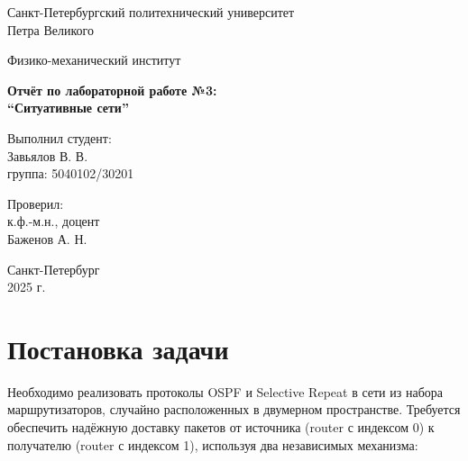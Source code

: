 \documentclass[a4paper,12pt]{article}
\begin{document}
\begin{titlepage}
    \begin{center}
        {\large Санкт-Петербургский политехнический университет\\Петра Великого}
    \end{center}
    
    \begin{center}
        {\large Физико-механический институт}
    \end{center}
    
    \vspace{8em}
    
    \begin{center}
        {\bfseries Отчёт по лабораторной работе №3:\\ ``Ситуативные сети''}
    \end{center}
    
    \vspace{4em}
     
    \begin{flushleft}
        \hspace{22em}Выполнил студент:\\
        \hspace{22em}Завьялов В. В.\\
        \hspace{22em}группа: 5040102/30201
        
        \vspace{2em}
        
        \hspace{22em}Проверил:\\
        \hspace{22em}к.ф.-м.н., доцент\\
        \hspace{22em}Баженов А. Н.
    \end{flushleft}
    
    \vspace{12em}
    
    \begin{center}
        Санкт-Петербург\\2025 г.
    \end{center}
    
\end{titlepage}

\tableofcontents

\newpage

\section{Постановка задачи}
Необходимо реализовать протоколы OSPF и Selective Repeat в сети из набора маршрутизаторов, случайно расположенных в двумерном пространстве. Требуется обеспечить надёжную доставку пакетов от источника (router с индексом 0) к получателю (router с индексом 1), используя два независимых механизма:
\end{document}
